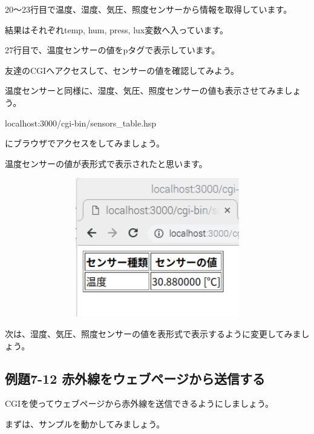 \documentclass[a4paper,12pt,dvipdfmx]{jarticle}
\begin{document}
20～23行目で温度、湿度、気圧、照度センサーから情報を取得しています。

結果はそれぞれtemp, hum, press,
lux変数へ入っています。

27行目で、温度センサーの値をpタグで表示しています。

\bigskip


\bigskip


\bigskip


友達のCGIへアクセスして、センサーの値を確認してみよう。

温度センサーと同様に、湿度、気圧、照度センサーの値も表示させてみましょう。

\begin{center}
\begin{boxedminipage}{0.5\textwidth}
localhost:3000/cgi-bin/sensors\_table.hsp
\end{boxedminipage}
\end{center}

にブラウザでアクセスをしてみましょう。

温度センサーの値が表形式で表示されたと思います。

%


\centering
\includegraphics[width=16.9cm,height=6.059cm]{ome7-img060.png}
\flushleft

次は、湿度、気圧、照度センサーの値を表形式で表示するように変更してみましょう。

\clearpage\subsection*{例題7-12
赤外線をウェブページから送信する}
CGIを使ってウェブページから赤外線を送信できるようにしましょう。

まずは、サンプルを動かしてみましょう。
\end{document}
